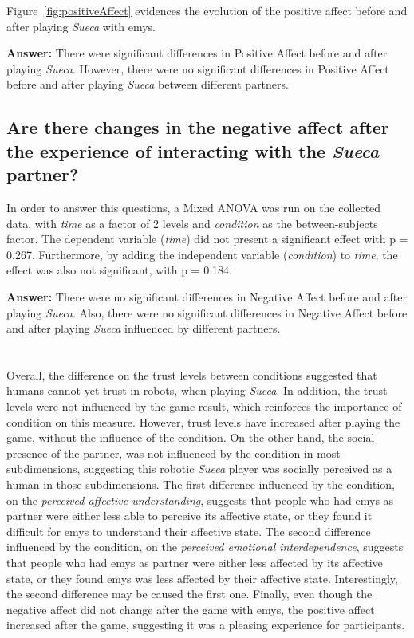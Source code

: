Figure~\ref{fig:positiveAffect} evidences the evolution of the positive affect before and after playing \emph{Sueca} with \ac{emys}.

\textbf{Answer:} There were significant differences in Positive Affect before and after playing \emph{Sueca}.
However, there were no significant differences in Positive Affect before and after playing \emph{Sueca} between different partners.

\subsection*{Are there changes in the negative affect after the experience of interacting with the \emph{Sueca} partner?}
In order to answer this questions, a Mixed ANOVA was run on the collected data, with \emph{time} as a factor of 2 levels and \emph{condition} as the between-subjects factor.
The dependent variable (\emph{time}) did not present a significant effect with p = 0.267.
Furthermore, by adding the independent variable (\emph{condition}) to \emph{time}, the effect was also not significant, with p = 0.184.

\textbf{Answer:} There were no significant differences in Negative Affect before and after playing \emph{Sueca}.
Also, there were no significant differences in Negative Affect before and after playing \emph{Sueca} influenced by different partners.

\section*{\centering*}

Overall, the difference on the trust levels between conditions suggested that humans cannot yet trust in robots, when playing \emph{Sueca}.
In addition, the trust levels were not influenced by the game result, which reinforces the importance of condition on this measure.
However, trust levels have increased after playing the game, without the influence of the condition.
On the other hand, the social presence of the partner, was not influenced by the condition in most subdimensions, suggesting this robotic \emph{Sueca} player was socially perceived as a human in those subdimensions.
The first difference influenced by the condition, on the \emph{perceived affective understanding}, suggests that people who had \ac{emys} as partner were either less able to perceive its affective state, or they found it difficult for \ac{emys} to understand their affective state.
The second difference influenced by the condition, on the \emph{perceived emotional interdependence}, suggests that people who had \ac{emys} as partner were either less affected by its affective state, or they found \ac{emys} was less affected by their affective state.
Interestingly, the second difference may be caused the first one.
Finally, even though the negative affect did not change after the game with \ac{emys}, the positive affect increased after the game, suggesting it was a pleasing experience for participants.


\clearpage
